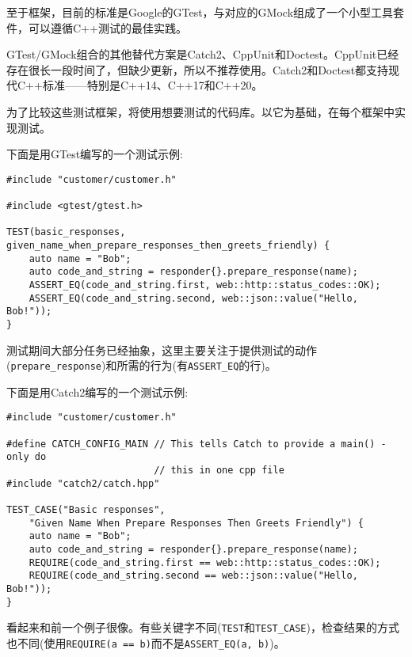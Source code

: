
至于框架，目前的标准是Google的GTest，与对应的GMock组成了一个小型工具套件，可以遵循C++测试的最佳实践。

GTest/GMock组合的其他替代方案是Catch2、CppUnit和Doctest。CppUnit已经存在很长一段时间了，但缺少更新，所以不推荐使用。Catch2和Doctest都支持现代C++标准——特别是C++14、C++17和C++20。

为了比较这些测试框架，将使用想要测试的代码库。以它为基础，在每个框架中实现测试。


下面是用GTest编写的一个测试示例:

\begin{lstlisting}[style=styleCXX]
#include "customer/customer.h"

#include <gtest/gtest.h>

TEST(basic_responses,
given_name_when_prepare_responses_then_greets_friendly) {
	auto name = "Bob";
	auto code_and_string = responder{}.prepare_response(name);
	ASSERT_EQ(code_and_string.first, web::http::status_codes::OK);
	ASSERT_EQ(code_and_string.second, web::json::value("Hello, Bob!"));
}
\end{lstlisting}

测试期间大部分任务已经抽象，这里主要关注于提供测试的动作(\texttt{prepare\_response})和所需的行为(有\texttt{ASSERT\_EQ}的行)。


下面是用Catch2编写的一个测试示例:

\begin{lstlisting}[style=styleCXX]
#include "customer/customer.h"

#define CATCH_CONFIG_MAIN // This tells Catch to provide a main() - only do
						  // this in one cpp file
#include "catch2/catch.hpp"

TEST_CASE("Basic responses",
	"Given Name When Prepare Responses Then Greets Friendly") {
	auto name = "Bob";
	auto code_and_string = responder{}.prepare_response(name);
	REQUIRE(code_and_string.first == web::http::status_codes::OK);
	REQUIRE(code_and_string.second == web::json::value("Hello, Bob!"));
}
\end{lstlisting}

看起来和前一个例子很像。有些关键字不同(\texttt{TEST}和\texttt{TEST\_CASE})，检查结果的方式也不同(使用\texttt{REQUIRE(a == b)}而不是\texttt{ASSERT\_EQ(a, b)})。


